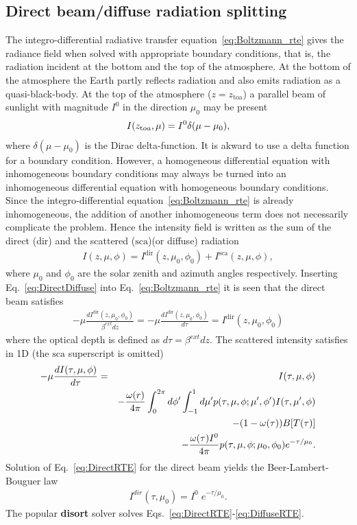 \subsection{Direct beam/diffuse radiation splitting}
The integro-differential radiative transfer
equation~\ref{eq:Boltzmann_rte} gives the radiance field when solved
with  appropriate boundary conditions, that is, the 
radiation incident at the bottom and the top of the atmosphere. At the 
bottom of the atmosphere the Earth partly reflects radiation and also
emits radiation as a quasi-black-body. At the top of the atmosphere
($z=z_{{\text{toa}}}$) a parallel beam of  sunlight with magnitude
$I^{0}$ in the direction $\mu_{0}$ may be present
\begin{eqnarray}
I(z_{{\text toa}},\mu)= I^{0} \delta(\mu-\mu_{0}),
  \label{eq:Boundary_toa}
\end{eqnarray}
where $\delta(\mu-\mu_{0})$ is the Dirac delta-function. It is akward
to use a delta function for a boundary condition. However, a
homogeneous differential equation with inhomogeneous boundary conditions
may always be turned into an inhomogeneous differential equation with
homogeneous boundary conditions. Since the  integro-differential
equation~\ref{eq:Boltzmann_rte} is already inhomogeneous, the addition
of another inhomogeneous term does not necessarily complicate the problem.
Hence  the intensity field is written as the sum of the direct
($\text{dir}$) and the scattered ($\text{sca}$)(or diffuse) radiation
\begin{eqnarray}
I(z,\mu, \phi)=I^{\text{dir}}(z,\mu_0, \phi_0)+I^{\text{sca}}(z,\mu, \phi),
\label{eq:DirectDiffuse}
\end{eqnarray}
where $\mu_0$ and $\phi_0$ are the solar zenith and azimuth angles
respectively. Inserting Eq.~\ref{eq:DirectDiffuse} into
Eq.~\ref{eq:Boltzmann_rte} it is seen that the direct beam satisfies
\begin{eqnarray}
-\mu\frac{dI^{\text{dir}}(z,\mu_0, \phi_0)}{\beta^{ext}dz}=
-\mu\frac{dI^{\text{dir}}(z,\mu_0, \phi_0)}{d\tau}=I^{\text{dir}}(z,\mu_0, \phi_0)
  \label{eq:DirectRTE}
\end{eqnarray}
where the optical depth is defined as $d\tau = \beta^{ext}dz$.
The scattered intensity satisfies in 1D (the $\text{sca}$
superscript is omitted) 
\begin{eqnarray}
 - \mu {dI(\tau,\mu, \phi) \over d\tau}& =& I(\tau,\mu, \phi) 
 \nonumber \\ & & -
  {\omega(r) \over 4\pi } \int^{2\pi}_{0}d\phi' \int^{1}_{-1}d\mu'
   p(\tau,\mu, \phi;\mu', \phi')I(\tau,\mu', \phi)
 \nonumber \\ & & 
   -(1-\omega(\tau))B[T(\tau)] 
\nonumber \\
& &    -\frac{\omega(\tau)I^{0}}{4\pi}p(\tau,\mu, \phi;\mu_{0}, \phi_0 )e^{-\tau/\mu_{0}}.
  \label{eq:DiffuseRTE}
\end{eqnarray}
Solution of Eq.~\ref{eq:DirectRTE} for the direct beam yields the 
Beer-Lambert-Bouguer law
\begin{eqnarray}
I^{dir}(\tau,\mu_0)=I^{0}\;e^{-\tau/\mu_{0}}.
  \label{eq:Beerlaw}
\end{eqnarray}
The popular {\bf disort} solver \citep{Stamnes1988c,stamnes2000}
solves Eqs.~\ref{eq:DirectRTE}-\ref{eq:DiffuseRTE}.


